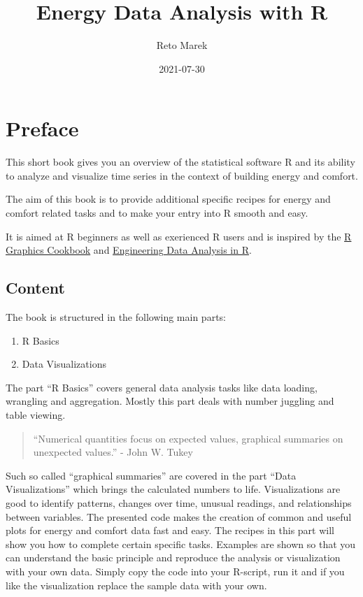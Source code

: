 \documentclass[
  a4paperpaper,
]{book}
\title{Energy Data Analysis with R}
\author{Reto Marek}
\date{2021-07-30}
\providecommand{\tightlist}{%
  \setlength{\itemsep}{0pt}\setlength{\parskip}{0pt}}
\begin{document}
\maketitle

{
\setcounter{tocdepth}{1}
\tableofcontents
}
\hypertarget{preface}{%
\chapter{Preface}\label{preface}}

This short book gives you an overview of the statistical software R and its ability to analyze and visualize time series in the context of building energy and comfort.

The aim of this book is to provide additional specific recipes for energy and comfort related tasks and to make your entry into R smooth and easy.

It is aimed at R beginners as well as exerienced R users and is inspired by the \href{https://r-graphics.org/}{R Graphics Cookbook} and \href{https://smogdr.github.io/edar_coursebook/}{Engineering Data Analysis in R}.

\hypertarget{content}{%
\section{Content}\label{content}}

The book is structured in the following main parts:

\begin{enumerate}
\def\labelenumi{\arabic{enumi}.}
\tightlist
\item
  R Basics
\item
  Data Visualizations
\end{enumerate}

The part ``R Basics'' covers general data analysis tasks like data loading, wrangling and aggregation. Mostly this part deals with number juggling and table viewing.

\begin{quote}
``Numerical quantities focus on expected values, graphical summaries on unexpected values.'' - John W. Tukey
\end{quote}

Such so called ``graphical summaries'' are covered in the part ``Data Visualizations'' which brings the calculated numbers to life. Visualizations are good to identify patterns, changes over time, unusual readings, and relationships between variables. The presented code makes the creation of common and useful plots for energy and comfort data fast and easy.
The recipes in this part will show you how to complete certain specific tasks. Examples are shown so that you can understand the basic principle and reproduce the analysis or visualization with your own data. Simply copy the code into your R-script, run it and if you like the visualization replace the sample data with your own.
\end{document}
